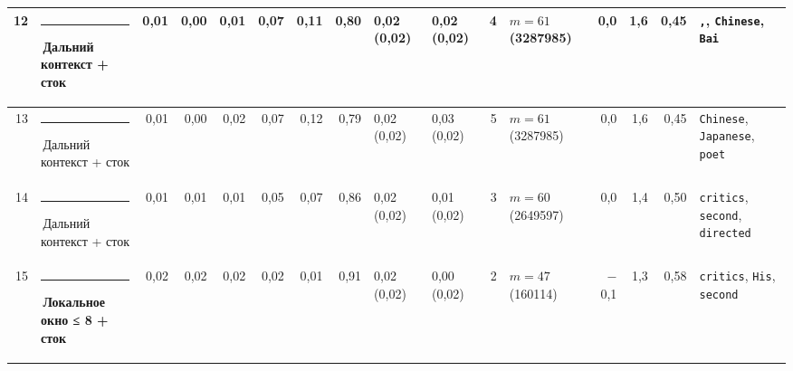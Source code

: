 \documentclass[10pt]{article}
\begin{document}
\begin{minipage}{\linewidth}
\begin{center}
{\begin{tabular}{|r|l|r|r|r|r|r|r|l|l|r|l|r|r|r|l|}
12 & \textcolor[HTML]{C3C2B7}{\rule{0.62em}{0.62em}}\,Дальний контекст + сток & 0,01 & 0,00 & 0,01 & 0,07 & 0,11 & 0,80 & 0,02 (0,02) & 0,02 (0,02) & 4 & $m{=}61$ (3287985) & 0,0 & 1,6 & 0,45 & \texttt{\textvisiblespace{},}, \texttt{\textvisiblespace{}Chinese}, \texttt{\textvisiblespace{}Bai} \\ \hline
13 & \textcolor[HTML]{C3C2B7}{\rule{0.62em}{0.62em}}\,Дальний контекст + сток & 0,01 & 0,00 & 0,02 & 0,07 & 0,12 & 0,79 & 0,02 (0,02) & 0,03 (0,02) & 5 & $m{=}61$ (3287985) & 0,0 & 1,6 & 0,45 & \texttt{\textvisiblespace{}Chinese}, \texttt{\textvisiblespace{}Japanese}, \texttt{\textvisiblespace{}poet} \\ \hline
14 & \textcolor[HTML]{C3C2B7}{\rule{0.62em}{0.62em}}\,Дальний контекст + сток & 0,01 & 0,01 & 0,01 & 0,05 & 0,07 & 0,86 & 0,02 (0,02) & 0,01 (0,02) & 3 & $m{=}60$ (2649597) & 0,0 & 1,4 & 0,50 & \texttt{\textvisiblespace{}critics}, \texttt{\textvisiblespace{}second}, \texttt{\textvisiblespace{}directed} \\ \hline
15 & \textcolor[HTML]{1BAF7A}{\rule{0.62em}{0.62em}}\,\textbf{Локальное окно ≤ 8 + сток} & 0,02 & 0,02 & 0,02 & 0,02 & 0,01 & 0,91 & 0,02 (0,02) & 0,00 (0,02) & 2 & $m{=}47$ (160114) & $-$0,1 & 1,3 & 0,58 & \texttt{\textvisiblespace{}critics}, \texttt{\textvisiblespace{}His}, \texttt{\textvisiblespace{}second} \\ \hline
\hline\end{tabular}}\end{center}
\end{minipage}
\par\vspace{0.4em}
\end{document}
